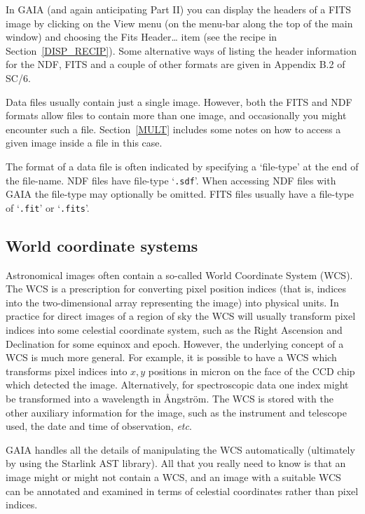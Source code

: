 \documentclass[twoside,11pt]{article}
\newcommand{\xref}[3]{#1}
\renewcommand{\_}{\texttt{\symbol{95}}}
\begin{document}
In GAIA (and again anticipating Part II) you can display the headers of a
FITS image by clicking on the {\sf View} menu (on the menu-bar along the
top of the main window) and choosing the {\sf Fits Header\ldots} item (see
the recipe in Section~\ref{DISP_RECIP}).  Some alternative ways of listing
the header information for the NDF, FITS and a couple of other formats are
given in \xref{Appendix B.2}{sc6}{EXAMFILE} of \xref{SC/6}{sc6}{}\cite{SC6}.

Data files usually contain just a single image.  However, both the FITS
and NDF formats allow files to contain more than one image, and occasionally
you might encounter such a file.  Section~\ref{MULT} includes some notes
on how to access a given image inside a file in this case.

The format of a data file is often indicated by specifying a `file-type'
at the end of the file-name.  NDF files have file-type `{\tt .sdf}'.
When accessing NDF files with GAIA the file-type may optionally be omitted.
FITS files usually have a file-type of `{\tt .fit}' or `{\tt .fits}'.

\subsection{\label{WCS}World coordinate systems}

Astronomical images often contain a so-called World Coordinate System
(WCS).  The WCS is a prescription for converting pixel position indices
(that is, indices into the two-dimensional array representing the image)
into physical units.  In practice for direct images of a region of sky
the WCS will usually transform pixel indices into some celestial coordinate
system, such as the Right Ascension and Declination for some equinox and
epoch.  However, the underlying concept of a WCS is much more general.
For example, it is possible to have a WCS which transforms pixel indices
into $x,y$\/ positions in micron on the face of the CCD chip which detected
the image.  Alternatively, for spectroscopic data one index might be
transformed into a wavelength in \AA ngstr\"{o}m.  The WCS is stored with
the other auxiliary information for the image, such as the instrument and
telescope used, the date and time of observation, \emph{etc}.

GAIA handles all the details of manipulating the WCS automatically
(ultimately by using the Starlink AST library).  All that you really
need to know is that an image might or might not contain a WCS, and an
image with a suitable WCS can be annotated and examined in terms of
celestial coordinates rather than pixel indices.
\end{document}
